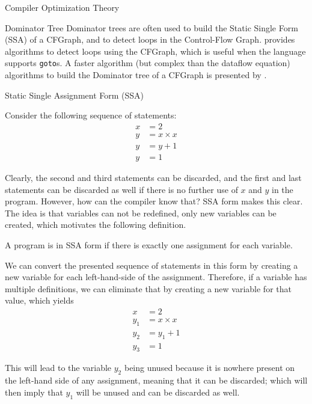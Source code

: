 \begin{section}{Compiler Optimization Theory}
\begin{subsection}{Dominator Tree}
	Dominator trees are often used to build the Static Single Form
	(SSA) of a CFGraph, and to detect loops in the Control-Flow
	Graph. \cite{appel2004modern} provides algorithms to detect
	loops using the CFGraph, which is useful when the language
	supports \texttt{goto}s. A faster algorithm
	(but complex than the dataflow equation) algorithms to build
	the Dominator tree of a CFGraph is presented by
	\cite{georgiadis2006finding}.

\end{subsection}

\begin{subsection}{Static Single Assignment Form (SSA)}

Consider the following sequence of statements:
\begin{align}
x &= 2 \nonumber \\
y &= x \times x \nonumber \\
y &= y + 1 \nonumber \\
y &= 1 \nonumber
\end{align}

Clearly, the second and third statements can be discarded, and the first
and last statements can be discarded as well if there is no further use of $x$ and $y$ in the program. However, how can the compiler know that? SSA form makes this clear. The idea is that variables can not be redefined, only new variables can be created, which motivates the following definition.

\begin{definition}
	A program is in SSA form if there is exactly one assignment for each
	variable.
\end{definition}

We can convert the presented sequence of statements in this form by creating
a new variable for each left-hand-side of the assignment. Therefore, if a
variable has multiple definitions, we can eliminate that by creating a new
variable for that value, which yields
\begin{align}
x &= 2 \nonumber \\
y_1 &= x \times x \nonumber \\
y_2 &= y_1 + 1 \nonumber \\
y_3 &= 1 \nonumber
\end{align}

This will lead to the variable $y_2$ being unused because it is nowhere present on the left-hand side of any assignment, meaning that it can be discarded; which will then imply that $y_1$ will be unused and can be discarded as well.


\end{subsection}
\end{section}
